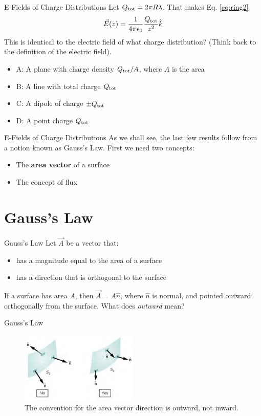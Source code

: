 \documentclass{beamer}
\begin{document}
\begin{frame}{E-Fields of Charge Distributions}
Let $Q_{\rm tot} = 2\pi R \lambda$.  That makes Eq. \ref{eq:ring2}
\begin{equation}
\vec{E}(z) = \frac{1}{4\pi\epsilon_0} \frac{Q_{\rm tot}}{z^2} \hat{k}
\end{equation}
This is identical to the electric field of what charge distribution?  (Think back to the definition of the electric field).
\begin{itemize}
\item A: A plane with charge density $Q_{\rm tot}/A$, where $A$ is the area
\item B: A line with total charge $Q_{\rm tot}$
\item C: A dipole of charge $\pm Q_{\rm tot}$
\item D: A point charge $Q_{\rm tot}$
\end{itemize}
\end{frame}

\begin{frame}{E-Fields of Charge Distributions}
As we shall see, the last few results follow from a notion known as \alert{Gauss's Law}.  First we need two concepts:
\begin{itemize}
\item The \textbf{area vector} of a surface
\item The concept of flux
\end{itemize}
\end{frame}

\section{Gauss's Law}

\begin{frame}{Gauss's Law}
Let $\vec{A}$ be a vector that:
\begin{itemize}
\item has a magnitude equal to the area of a surface
\item has a direction that is orthogonal to the surface
\end{itemize}
If a surface has area $A$, then $\vec{A} = A \hat{n}$, where $\hat{n}$ is normal, and pointed outward orthogonally from the surface.  What does \textit{outward} mean?
\end{frame}

\begin{frame}{Gauss's Law}
\begin{figure}
\centering
\includegraphics[width=0.5\textwidth]{figures/areaVector.png}
\caption{\label{fig:n} The convention for the area vector direction is outward, not inward.}
\end{figure}
\end{frame}
\end{document}
